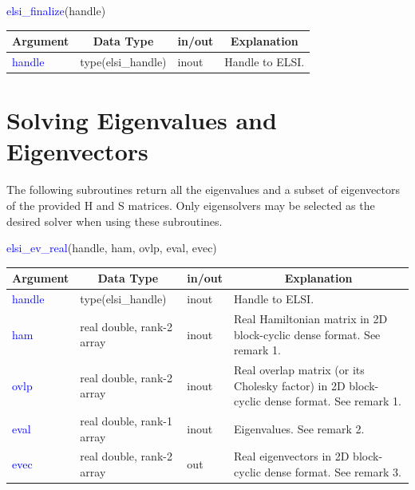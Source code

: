 \documentclass{report}
\begin{document}
\begin{labeling}{\hspace{6cm}}
\item [\hspace{0.3cm} \textcolor{blue}{elsi\_finalize}(handle)]
\end{labeling}

\begin{tabular}[]{|p{30mm}|p{30mm}|p{15mm}|p{90mm}|}
\hline
\multicolumn{1}{|c|}{\textbf{Argument}} & \multicolumn{1}{c|}{\textbf{Data Type}} & \multicolumn{1}{c|}{\textbf{in/out}} & \multicolumn{1}{c|}{\textbf{Explanation}}\\
\hline
\textcolor{blue}{handle} & type(elsi\_handle) & inout & Handle to ELSI.\\
\hline
\end{tabular}

\section{Solving Eigenvalues and Eigenvectors}
\label{sec:ev}
The following subroutines return all the eigenvalues and a subset of eigenvectors of the provided H and S matrices.  Only eigensolvers may be selected as the desired solver when using these subroutines.\\

\begin{labeling}{\hspace{6cm}}
\item [\hspace{0.3cm} \textcolor{blue}{elsi\_ev\_real}(handle, ham, ovlp, eval, evec)]
\end{labeling}

\begin{tabular}[]{|p{20mm}|p{45mm}|p{15mm}|p{85mm}|}
\hline
\multicolumn{1}{|c|}{\textbf{Argument}} & \multicolumn{1}{c|}{\textbf{Data Type}} & \multicolumn{1}{c|}{\textbf{in/out}} & \multicolumn{1}{c|}{\textbf{Explanation}}\\
\hline
\textcolor{blue}{handle} & type(elsi\_handle)        & inout & Handle to ELSI.\\
\hline
\textcolor{blue}{ham}    & real double, rank-2 array & inout & Real Hamiltonian matrix in 2D block-cyclic dense format.  See remark 1.\\
\hline
\textcolor{blue}{ovlp}   & real double, rank-2 array & inout & Real overlap matrix (or its Cholesky factor) in 2D block-cyclic dense format.  See remark 1.\\
\hline
\textcolor{blue}{eval}   & real double, rank-1 array & inout & Eigenvalues.  See remark 2.\\
\hline
\textcolor{blue}{evec}   & real double, rank-2 array & out   & Real eigenvectors in 2D block-cyclic dense format.  See remark 3.\\
\hline
\end{tabular}
\end{document}
